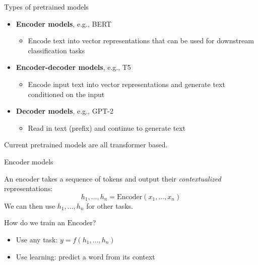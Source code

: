 \documentclass[usenames,dvipsnames,notes,11pt,aspectratio=169,hyperref={colorlinks=true, linkcolor=blue}]{beamer}
\begin{document}
\begin{frame}
    {Types of pretrained models}
   
    \begin{itemize}[<+->]
        \itemsep1em
        \item \textbf{Encoder models}, e.g., BERT
            \begin{itemize}[<.->]
                \item Encode text into vector representations that can be used for downstream classification tasks
            \end{itemize}
        \item \textbf{Encoder-decoder models}, e.g., T5
            \begin{itemize}[<.->]
                \item Encode input text into vector representations and generate text conditioned on the input
            \end{itemize}
        \item \textbf{Decoder models}, e.g., GPT-2
            \begin{itemize}[<.->]
                \item Read in text (prefix) and continue to generate text
            \end{itemize}
    \end{itemize}

    \pause\medskip
    Current pretrained models are all transformer based.
\end{frame}

\begin{frame}
    {Encoder models}
    
    An encoder takes a sequence of tokens and output their {\em contextualized} representations:
    $$
        h_1,\ldots,h_n = \mathrm{Encoder}(x_1,\ldots,x_n)
    $$
    We can then use $h_1,\ldots,h_n$ for other tasks.

    \pause\bigskip
    How do we train an $\mathrm{Encoder}$?\\
    \begin{itemize}
        \item Use any  task: $y=f(h_1,\ldots,h_n)$
        \item Use  learning: predict a word from its context 
    \end{itemize}
\end{frame}
\end{document}
